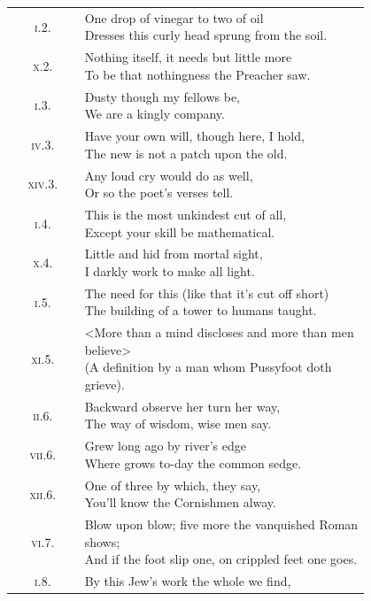 \begin{longtable} {c p{0.8\linewidth}} 
\textsc{i}.2. &  \makecell[l]{One drop of vinegar to two of oil\\
Dresses this curly head sprung from the soil.}\\
\textsc{x}.2. &  \makecell[l]{Nothing itself, it needs but little more\\
To be that nothingness the Preacher saw.}\\
\textsc{i}.3. &  \makecell[l]{Dusty though my fellows be,\\
We are a kingly company.}\\
\textsc{iv}.3. &  \makecell[l]{Have your own will, though here, I hold,\\
The new is not a patch upon the old.}\\
\textsc{xiv}.3. &  \makecell[l]{Any loud cry would do as well,\\
Or so the poet's verses tell.}\\
\textsc{i}.4. & \makecell[l]{ This is the most unkindest cut of all,\\
Except your skill be mathematical.}\\
\textsc{x}.4. &  \makecell[l]{Little and hid from mortal sight,\\
I darkly work to make all light.}\\
\textsc{i}.5. &  \makecell[l]{The need for this (like that it's cut off short)\\
The building of a tower to humans taught.}\\
\textsc{xi}.5. & \makecell[l]{ <More than a mind discloses and more than men believe>\\
(A definition by a man whom Pussyfoot doth grieve).}\\
\textsc{ii}.6. &  \makecell[l]{Backward observe her turn her way,\\
The way of wisdom, wise men say.}\\
\textsc{vii}.6. &  \makecell[l]{Grew long ago by river's edge\\
Where grows to-day the common sedge.}\\
\textsc{xii}.6. &  \makecell[l]{One of three by which, they say,\\
You'll know the Cornishmen alway.}\\
\textsc{vi}.7. &  \makecell[l]{Blow upon blow; five more the vanquished Roman shows;\\
And if the foot slip one, on crippled feet one goes.}\\
\textsc{i}.8. &  \makecell[l]{By this Jew's work the whole we find,\\
}
\end{longtable}
